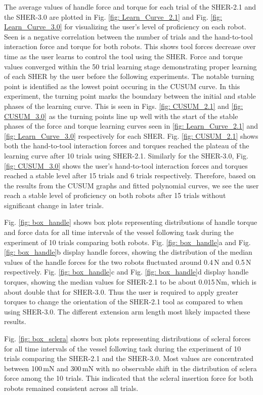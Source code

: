 \documentclass[letterpaper, 10 pt, conference]{ieeeconf}  %
\begin{document}
The average values of handle force and torque for each trial of the SHER-2.1 and the SHER-3.0 are plotted in Fig. \ref{fig: Learn_Curve_2.1} and Fig. \ref{fig: Learn_Curve_3.0} for visualizing the user's level of proficiency on each robot. Seen is a negative correlation between the number of trials and the hand-to-tool interaction force and torque for both robots. This shows tool forces decrease over time as the user learns to control the tool using the SHER. Force and torque values converged within the 50 trial learning stage demonstrating proper learning of each SHER by the user before the following experiments. The notable turning point is identified as the lowest point occuring in the CUSUM curve. In this experiment, the turning point marks the boundary between the initial and stable phases of the learning curve. 
This is seen in Figs. \ref{fig: CUSUM_2.1} and \ref{fig: CUSUM_3.0} as the turning points line up well with the start of the stable phases of the force and torque learning curves seen in \ref{fig: Learn_Curve_2.1} and \ref{fig: Learn_Curve_3.0} respectively for each SHER.
Fig. \ref{fig: CUSUM_2.1} shows both the hand-to-tool interaction forces and torques reached the plateau of the learning curve after 10 trials using SHER-2.1. Similarly for the SHER-3.0, Fig.\ref{fig: CUSUM_3.0} shows the user's hand-to-tool interaction forces and torques reached a stable level after 15 trials and 6 trials respectively. Therefore, based on the results from the CUSUM graphs and fitted polynomial curves, we see the user reach a stable level of proficiency on both robots after 15 trials without significant change in later trials.

Fig. \ref{fig: box_handle} shows box plots representing distributions of handle torque and force data for all time intervals of the vessel following task during the experiment of 10 trials comparing both robots.
Fig. \ref{fig: box_handle}a and Fig. \ref{fig: box_handle}b display handle forces, showing the distribution of the median values of the handle forces for the two robots fluctuated around 0.4\,N and 0.5\,N respectively. Fig. \ref{fig: box_handle}c and Fig. \ref{fig: box_handle}d display handle torques, showing the median values for SHER-2.1 to be about 0.015\,Nm, which is about double that for SHER-3.0. Thus the user is required to apply greater torques to change the orientation of the SHER-2.1 tool  as compared to when using SHER-3.0. The different extension arm length most likely impacted these results.

Fig. \ref{fig: box_sclera} shows box plots representing distributions of scleral forces for all time intervals of the vessel following task during the experiment of 10 trials comparing the SHER-2.1 and the SHER-3.0. Most values are concentrated between 100\,mN and 300\,mN with no observable shift in the distribution of sclera force among the 10 trials. This indicated that the scleral insertion force for both robots remained consistent across all trials.
\end{document}
